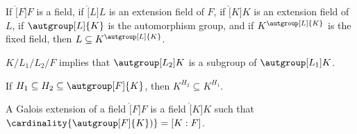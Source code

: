     \begin{theorem}
        If $\ring[F]{F}$ is a field, if $\ring[L]{L}$ is an extension field
        of $F$, if $\ring[K]{K}$ is an extension field of $L$, if
        $\autgroup[L]{K}$ is the automorphism group, and if
        $K^{\autgroup[L]{K}}$ is the fixed field, then
        $L\subseteq{K}^{\autgroup[L]{K}}$.
    \end{theorem}
    \begin{theorem}
        $K/L_{1}/L_{2}/F$ implies that $\autgroup[L_{2}]{K}$ is a subgroup
        of $\autgroup[L_{1}]{K}$.
    \end{theorem}
    \begin{theorem}
        If $H_{1}\subseteq{H}_{2}\subseteq\autgroup[F]{K}$, then
        $K^{H_{2}}\subseteq{K}^{H_{1}}$.
    \end{theorem}
    \begin{definition}
        A Galois extension of a field $\ring[F]{F}$ is a field $\ring[K]{K}$
        such that $\cardinality{\autgroup[F]{K})}=[K:F]$.
    \end{definition}
